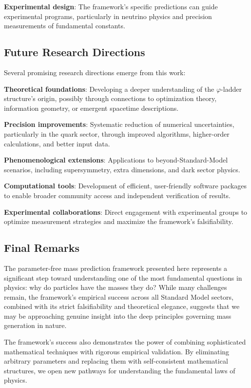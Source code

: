 \documentclass[%
amsmath,amssymb,
aps,
prb,
floatfix,
twocolumn
]{revtex4-2}
\begin{document}
\textbf{Experimental design}: The framework's specific predictions can guide experimental programs, particularly in neutrino physics and precision measurements of fundamental constants.

\subsection{Future Research Directions}

Several promising research directions emerge from this work:

\textbf{Theoretical foundations}: Developing a deeper understanding of the $\varphi$-ladder structure's origin, possibly through connections to optimization theory, information geometry, or emergent spacetime descriptions.

\textbf{Precision improvements}: Systematic reduction of numerical uncertainties, particularly in the quark sector, through improved algorithms, higher-order calculations, and better input data.

\textbf{Phenomenological extensions}: Applications to beyond-Standard-Model scenarios, including supersymmetry, extra dimensions, and dark sector physics.

\textbf{Computational tools}: Development of efficient, user-friendly software packages to enable broader community access and independent verification of results.

\textbf{Experimental collaborations}: Direct engagement with experimental groups to optimize measurement strategies and maximize the framework's falsifiability.

\subsection{Final Remarks}

The parameter-free mass prediction framework presented here represents a significant step toward understanding one of the most fundamental questions in physics: why do particles have the masses they do? While many challenges remain, the framework's empirical success across all Standard Model sectors, combined with its strict falsifiability and theoretical elegance, suggests that we may be approaching genuine insight into the deep principles governing mass generation in nature.

The framework's success also demonstrates the power of combining sophisticated mathematical techniques with rigorous empirical validation. By eliminating arbitrary parameters and replacing them with self-consistent mathematical structures, we open new pathways for understanding the fundamental laws of physics.
\end{document}
